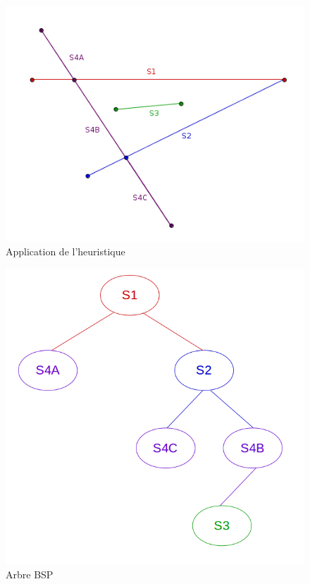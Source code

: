 \documentclass[11pt,a4paper]{article}
\theoremstyle{definition}
\theoremstyle{remark}
\begin{document}
\begin{figure}[!h]
\centering
\includegraphics[scale=0.5]{free_splits_1.png}
\caption{Application de l'heuristique}
\label{heuristic_splits}
\end{figure}


\begin{figure}[!h]
\centering
\includegraphics[scale=0.4]{free_splits_3.png}
\caption{Arbre BSP}
\label{split_bsp}
\end{figure}
\end{document}
